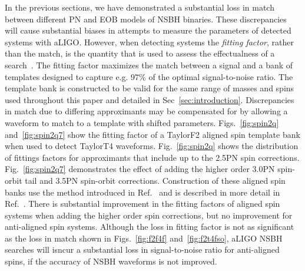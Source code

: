 In the previous sections, we have demonstrated a substantial loss in match between
different \ac{PN} and EOB models of \ac{NSBH} binaries. These discrepancies
will cause substantial biases in attempts to measure the parameters of
detected systems with aLIGO. However, when detecting systems the
\emph{fitting factor}, rather than the match, is the quantity that is used to
assess the effectualness of a search~\cite{Apostolatos:1996rf}. The fitting
factor maximizes the match between a signal and a bank of templates designed
to capture e.g. $97\%$ of the optimal signal-to-noise ratio. The template bank is constructed to be 
valid for the same range of masses and spins used
throughout this paper and detailed in Sec~\ref{sec:introduction}. Discrepancies in
match due to differing approximants may be compensated for by allowing a waveform
to match to a template with shifted parameters.
Figs.~\ref{fig:spin2q} and~\ref{fig:spin2q7} show the fitting
factor of a TaylorF2 aligned spin template bank when used to detect TaylorT4
waveforms. Fig.~\ref{fig:spin2q} shows the distribution of fittings factors for approximants that include up to the 2.5\ac{PN} 
spin corrections. Fig.~\ref{fig:spin2q7} demonstrates the effect of adding the higher order
3.0\ac{PN} spin-orbit tail and 3.5\ac{PN} spin-orbit corrections.
Construction of these aligned spin banks use the method introduced
in Ref.~\cite{Brown:2012qf} and is described in more detail in Ref.~\cite{Harry:2013effectualness}.
There is substantial improvement in the fitting factors of aligned spin systems when
adding the higher order spin corrections, but no improvement for anti-aligned spin systems. 
Although the loss in fitting factor is not as significant as the loss in match shown in
Figs.~\ref{fig:f2f4f} and~\ref{fig:f2t4fso}, aLIGO \ac{NSBH} searches will isncur a substantial loss in 
signal-to-noise ratio for anti-aligned spins, if the accuracy of \ac{NSBH} waveforms is not improved. 

